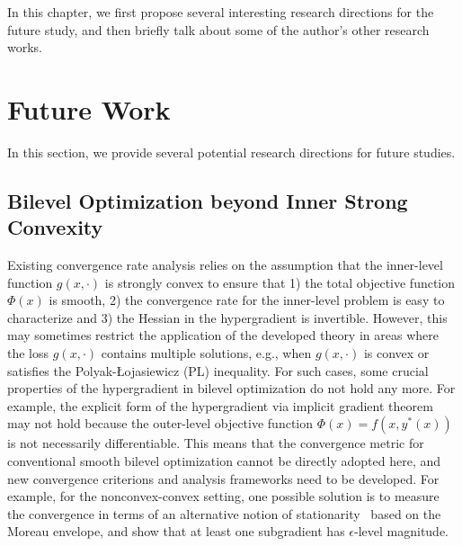 \documentclass{osudissert96}
\begin{document}
In this chapter, we first propose several interesting research directions for the future study, and then briefly talk about some of the author's other research works. 

\section{Future Work}
In this section, we provide several potential research directions for future studies. 

\subsection*{Bilevel Optimization beyond Inner Strong Convexity}
Existing convergence rate analysis relies on the assumption that the inner-level function $g(x,\cdot)$ is strongly convex to ensure that 1) the total objective function $\Phi(x)$ is smooth, 2) the convergence rate for the inner-level problem is easy to characterize and 3) the Hessian in the hypergradient is invertible. However, this may sometimes restrict the application of the developed theory in areas where the loss $g(x,\cdot)$ contains multiple solutions, e.g., when $g(x,\cdot)$ is convex or satisfies the Polyak-{\L}ojasiewicz  (PL) inequality. For such cases, some crucial properties of the hypergradient in bilevel optimization do not hold any more. For example, the explicit form of the hypergradient via implicit gradient theorem may not hold because the outer-level objective function $\Phi(x)=f(x,y^*(x))$ is not necessarily differentiable. This means that the convergence metric for conventional smooth bilevel optimization cannot be directly adopted here, and new convergence criterions and analysis frameworks need to be developed. For example, for the nonconvex-convex setting, one possible solution is to measure the convergence in terms of an alternative notion of stationarity~\cite{davis2019stochastic} based on the Moreau envelope, and show that at least one subgradient has $\epsilon$-level magnitude. 
\end{document}
